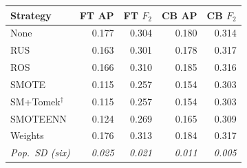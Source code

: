 \begin{tabular}{@{}lrrrr@{}}
\toprule
Strategy & FT AP & FT $F_2$ & CB AP & CB $F_2$ \\
\midrule
None & 0.177 & 0.304 & 0.180 & 0.314 \\
RUS & 0.163 & 0.301 & 0.178 & 0.317 \\
ROS & 0.166 & 0.310 & 0.185 & 0.316 \\
SMOTE & 0.115 & 0.257 & 0.154 & 0.303 \\
SM+Tomek$^{\dagger}$ & 0.115 & 0.257 & 0.154 & 0.303 \\
SMOTEENN & 0.124 & 0.269 & 0.165 & 0.309 \\
Weights & 0.176 & 0.313 & 0.184 & 0.317 \\
\textit{Pop.\ SD (six)} & \textit{0.025} & \textit{0.021} & \textit{0.011} & \textit{0.005} \\
\bottomrule
\end{tabular}
